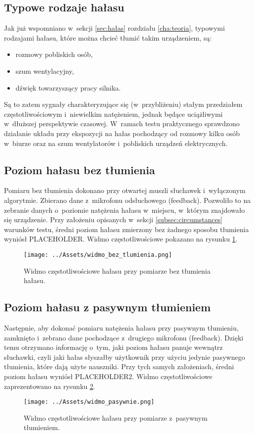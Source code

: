 \subsection{Typowe rodzaje hałasu}
Jak już wspomniano w~sekcji \ref{sec:hałas} rozdziału \ref{cha:teoria}, typowymi rodzajami hałasu, które można chcieć tłumić takim urządzeniem, są:
\begin{itemize}
	\item rozmowy pobliskich osób,
	\item szum wentylacyjny,
	\item dźwięk towarzyszący pracy silnika.
\end{itemize}
Są to zatem sygnały charakteryzujące się (w~przybliżeniu) stałym przedziałem częstotliwościowym i~niewielkim natężeniem, jednak będące uciążliwymi w~dłuższej perspektywie czasowej. W~ramach testu praktycznego sprawdzono działanie układu przy ekspozycji na hałas pochodzący od rozmowy kilku osób w~biurze oraz na szum wentylatorów i~pobliskich urządzeń elektrycznych.
\subsection{Poziom hałasu bez tłumienia}
Pomiaru bez tłumienia dokonano przy otwartej muszli słuchawek i~wyłączonym algorytmie. Zbierano dane z~mikrofonu odsłuchowego (feedback). Pozwoliło to na zebranie danych o~poziomie natężenia hałasu w~miejscu, w~którym znajdowało się urządzenie. Przy założeniu opisanych w~sekcji \ref{subsec:circumstances} warunków testu, średni poziom hałasu zmierzony bez żadnego sposobu tłumienia wyniósł PLACEHOLDER. %
Widmo częstotliwościowe pokazano na rysunku \ref{fig:widmo_bez}.
\begin{figure}[h!]
	\centering
	\texttt{[image: ../Assets/widmo\_bez\_tlumienia.png]}
	\caption{Widmo częstotliwościowe hałasu przy pomiarze bez tłumienia hałasu.}
	\label{fig:widmo_bez}
\end{figure}

\subsection{Poziom hałasu z pasywnym tłumieniem}
Następnie, aby dokonać pomiaru natężenia hałasu przy pasywnym tłumieniu, zamknięto i~zebrano dane pochodzące z~drugiego mikrofonu (feedback). Dzięki temu otrzymano informację o~tym, jaki poziom hałasu panuje wewnątrz słuchawki, czyli jaki hałas słyszałby użytkownik przy użyciu jedynie pasywnego tłumienia, które dają użyte nauszniki. Przy tych samych założeniach, średni poziom hałasu wyniósł PLACEHOLDER2. %
Widmo częstotliwościowe zaprezentowano na rysunku \ref{fig:widmo_pasywnie}. 
\begin{figure}[h!]
	\centering
	\texttt{[image: ../Assets/widmo\_pasywnie.png]}	
	\caption{Widmo częstotliwościowe hałasu przy pomiarze z~pasywnym tłumieniem.}
	\label{fig:widmo_pasywnie}
\end{figure}

